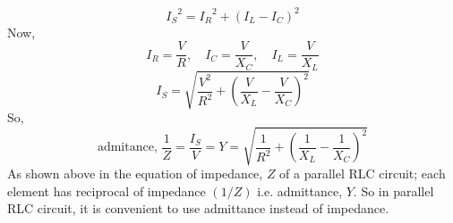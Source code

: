 \documentclass[../main.tex]{subfiles}
\begin{document}
\[{I_S}^2={I_R}^2+\left( I_L-I_C \right)^2\]
Now,
\[I_R=\frac{V}{R},\quad I_C=\frac{V}{X_C},\quad I_L=\frac{V}{X_L}\]
\[I_S=\sqrt{\frac{V^2}{R^2}+\left( \frac{V}{X_L}-\frac{V}{X_C} \right)^2}\]
So,
\[\text{admitance, }\frac{1}{Z}=\frac{I_S}{V}=Y=\sqrt{\frac{1}{R^2}+\left( \frac{1}{X_L}-\frac{1}{X_C} \right)^2}\]
As shown above in the equation of impedance, $ Z $ of a parallel RLC circuit; each element has reciprocal of impedance $ (1 / Z) $ i.e. admittance, $ Y $. So in parallel RLC circuit, it is convenient to use admittance instead of impedance.
\end{document}
